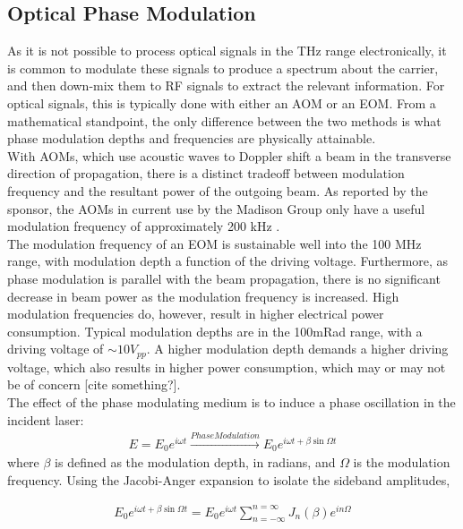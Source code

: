 \subsection{Optical Phase Modulation}

As it is not possible to process optical signals in the THz range electronically,
it is common to modulate these signals to produce a spectrum about the carrier,
and then down-mix them to RF signals to extract the relevant information.
For optical signals, this is typically done with either an AOM or an EOM. From
a mathematical standpoint, the only difference between the two methods is
what phase modulation depths and frequencies are physically attainable. \\

With AOMs, which use acoustic waves to Doppler shift a beam in the transverse
direction of propagation, there is a distinct tradeoff between modulation
frequency and the resultant power of the outgoing beam. As reported by the
sponsor, the AOMs in current use by the Madison Group only have a useful
modulation frequency of approximately 200 kHz \cite{madison14}. \\

The modulation frequency of an EOM is sustainable well into the 100 MHz range,
with modulation depth a function of the driving voltage. Furthermore, as
phase modulation is parallel with the beam propagation, there is no significant
decrease in beam power as the modulation frequency is increased. High modulation
frequencies do, however, result in higher electrical power consumption.
Typical modulation depths are in the 100mRad range, with a driving voltage of
$\sim 10 V_{pp}$. A higher modulation depth demands a higher driving voltage,
which also results in higher power consumption, which may or may not be of
concern [cite something?]. \\

The effect of the phase modulating medium is to induce a phase oscillation
in the incident laser:
\begin{gather}
  E = E_0 e^{i\omega t} \xrightarrow{Phase Modulation}
    E_0 e^{i \omega t + \beta \sin \Omega t}
\end{gather}
where $\beta$ is defined as the modulation depth, in radians, and $\Omega$ is the
modulation frequency. Using the Jacobi-Anger expansion to isolate the sideband
amplitudes,

\begin{gather}
  E_0 e^{i \omega t + \beta \sin \Omega t}  =
  E_0 e^{i\omega t} \sum_{n = -\infty}^{n = \infty} J_n(\beta)e^{in\Omega}
\end{gather}

